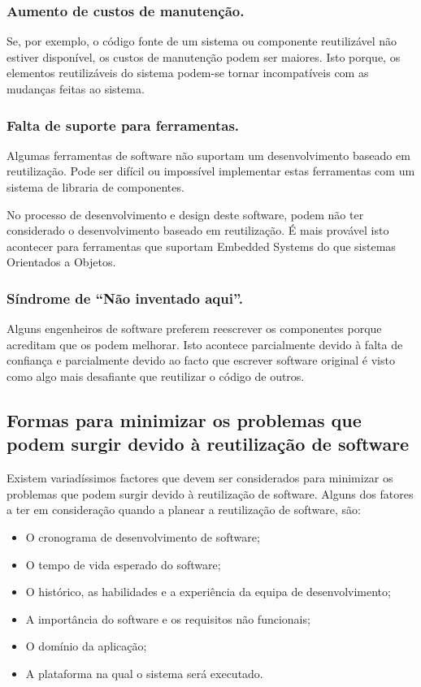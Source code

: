 \documentclass[runningheads]{llncs}
\begin{document}
\subsubsection{Aumento de custos de manutenção.}

Se, por exemplo, o código fonte de um sistema ou componente reutilizável não estiver disponível, os custos de manutenção podem ser maiores. Isto porque, os elementos reutilizáveis do sistema podem-se tornar incompatíveis com as mudanças feitas ao sistema.

\subsubsection{Falta de suporte para ferramentas.}

Algumas ferramentas de software não suportam um desenvolvimento baseado em reutilização. Pode ser difícil ou impossível implementar estas ferramentas com um sistema de libraria de componentes. \par
No processo de desenvolvimento e design deste software, podem não ter considerado o desenvolvimento baseado em reutilização. É mais provável isto acontecer para ferramentas que suportam Embedded Systems do que sistemas Orientados a Objetos.

\subsubsection{Síndrome de “Não inventado aqui”.}

Alguns engenheiros de software preferem reescrever os componentes porque acreditam que os podem melhorar. Isto acontece parcialmente devido à falta de confiança e parcialmente devido ao facto que escrever software original é visto como algo mais desafiante que reutilizar o código de outros.


\subsection{Formas para minimizar os problemas que podem surgir devido à reutilização de software}

Existem variadíssimos factores que devem ser considerados para minimizar os problemas que podem surgir devido à reutilização de software. Alguns dos fatores a ter em consideração quando a planear a reutilização de software, são:

\begin{itemize}
    \item O cronograma de desenvolvimento de software;
    \item O tempo de vida esperado do software;
    \item O histórico, as habilidades e a experiência da equipa de desenvolvimento;
    \item A importância do software e os requisitos não funcionais;
    \item O domínio da aplicação;
    \item A plataforma na qual o sistema será executado.
\end{itemize}
\end{document}
